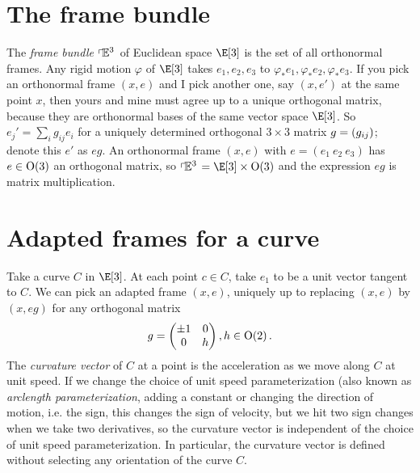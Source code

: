\section{The frame bundle}
The \emph{frame bundle} \(\left\ulcorner\!\mathbb{E}^{3}\right.\) of Euclidean space \(\E[3]\) is the set of all orthonormal frames. 
Any rigid motion \(\varphi\) of \(\E[3]\) takes \(e_1, e_2, e_3\) to \(\varphi_* e_1, \varphi_* e_2, \varphi_* e_3\).
If you pick an orthonormal frame \((x,e)\) and I pick another one, say \((x,e')\) at the same point \(x\), then yours and mine must agree up to a unique orthogonal matrix, because they are orthonormal bases of the same vector space \(\E[3]\).
So \(e_j' = \sum_i g_{ij} e_i\) for a uniquely determined orthogonal \(3 \times 3\) matrix \(g=\left(g_{ij}\right)\); denote this \(e'\) as \(eg\).
An orthonormal frame \((x,e)\) with \(e=(e_1 \ e_2 \ e_3)\) has \(e \in \textrm{O}\!\left(3\right)\) an orthogonal matrix,  so \(\frameBundleE{3}=\E[3] \times \Orth{3}\) and the expression \(eg\) is matrix multiplication.

\section{Adapted frames for a curve}
Take a curve \(C\) in \(\E[3]\).
At each point \(c \in C\), take \(e_1\) to be a unit vector tangent to \(C\).
We can pick an adapted frame \((x,e)\), uniquely up to replacing \((x,e)\) by \((x,eg)\) for any orthogonal matrix
\[
g=
\begin{pmatrix}
\pm1&0\\
0&h
\end{pmatrix},
h\in\textrm{O}\!\left(2\right).
\]
The \emph{curvature vector}%
  of \(C\) at a point is the acceleration as we move along \(C\) at unit speed.
If we change the choice of unit speed parameterization (also known as \emph{arclength parameterization}, adding a constant or changing the direction of motion, i.e. the sign, this changes the sign of velocity, but we hit two sign changes when we take two derivatives, so the curvature vector is independent of the choice of unit speed parameterization.
In particular, the curvature vector is defined without selecting any orientation of the curve \(C\).

